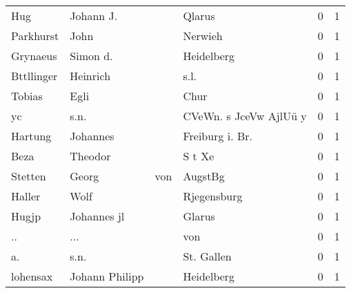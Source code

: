 \begin{tabular}{llllrr}
                      Hug &                          Johann J. &             &                                      Qlarus &          0 &         1 \\
                Parkhurst &                               John &             &                                     Nerwieh &          0 &         1 \\
                 Grynaeus &                           Simon d. &             &                                  Heidelberg &          0 &         1 \\
               Bttllinger &                           Heinrich &             &                                        s.l. &          0 &         1 \\
                   Tobias &                               Egli &             &                                        Chur &          0 &         1 \\
                       yc &                               s.n. &             &                      CVeWn. s JceVw AjlUü y &          0 &         1 \\
                  Hartung &                           Johannes &             &                            Freiburg i. Br.  &          0 &         1 \\
                     Beza &                            Theodor &             &                                      S t Xe &          0 &         1 \\
                  Stetten &                              Georg &         von &                                     AugstBg &          0 &         1 \\
                   Haller &                               Wolf &             &                                 Rjegensburg &          0 &         1 \\
                    Hugjp &                        Johannes jl &             &                                      Glarus &          0 &         1 \\
                       .. &                                ... &             &                                         von &          0 &         1 \\
                       a. &                               s.n. &             &                                  St. Gallen &          0 &         1 \\
                 lohensax &                     Johann Philipp &             &                                  Heidelberg &          0 &         1 \\

\end{tabular}
